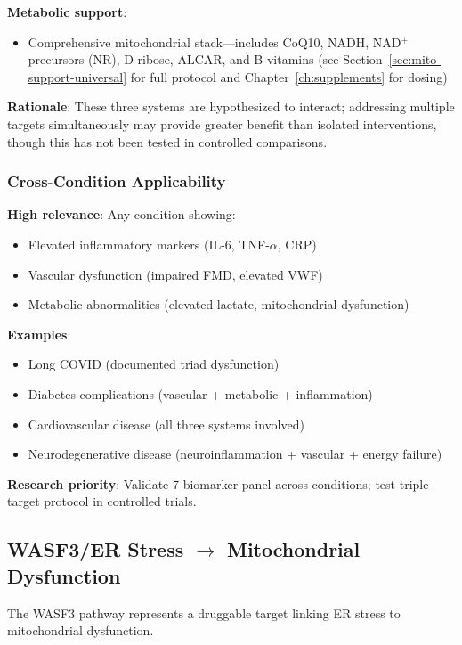 \textbf{Metabolic support}:
\begin{itemize}
    \item Comprehensive mitochondrial stack---includes CoQ10, NADH, NAD$^+$ precursors (NR), D-ribose, ALCAR, and B vitamins (see Section~\ref{sec:mito-support-universal} for full protocol and Chapter~\ref{ch:supplements} for dosing)
\end{itemize}

\textbf{Rationale}: These three systems are hypothesized to interact; addressing multiple targets simultaneously may provide greater benefit than isolated interventions, though this has not been tested in controlled comparisons.

\subsubsection{Cross-Condition Applicability}

\textbf{High relevance}: Any condition showing:
\begin{itemize}
    \item Elevated inflammatory markers (IL-6, TNF-$\alpha$, CRP)
    \item Vascular dysfunction (impaired FMD, elevated VWF)
    \item Metabolic abnormalities (elevated lactate, mitochondrial dysfunction)
\end{itemize}

\textbf{Examples}:
\begin{itemize}
    \item Long COVID (documented triad dysfunction)
    \item Diabetes complications (vascular + metabolic + inflammation)
    \item Cardiovascular disease (all three systems involved)
    \item Neurodegenerative disease (neuroinflammation + vascular + energy failure)
\end{itemize}

\textbf{Research priority}: Validate 7-biomarker panel across conditions; test triple-target protocol in controlled trials.

\subsection{WASF3/ER Stress $\rightarrow$ Mitochondrial Dysfunction}
\label{sec:wasf3-translational}

The WASF3 pathway represents a druggable target linking ER stress to mitochondrial dysfunction.

